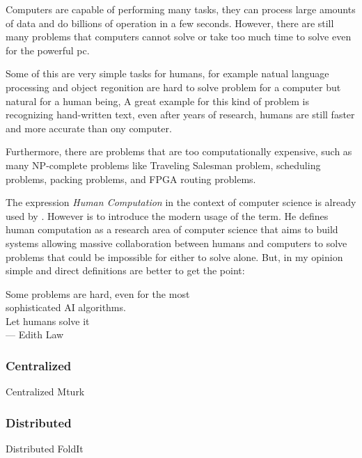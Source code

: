 
Computers are capable of performing many tasks, they can process large
amounts of data and do billions of operation in a few seconds.
However, there are still many problems that computers cannot solve
or take too much time to solve even for the powerful pc.

Some of this are very simple tasks for humans, for example natual language
processing and object regonition are hard to solve problem for a computer
but natural for a human being, A great example for this kind of problem
is recognizing hand-written text, even after years of research,
humans are still faster and more accurate than ony computer.

Furthermore, there are problems that are too computationally expensive,
such as many NP-complete problems like Traveling Salesman problem,
scheduling problems, packing problems, and FPGA routing problems.

The expression \emph{Human Computation} in the context of computer
science is already used by \cite{cogprints499}. However is \cite{human:comp}
to introduce the modern usage of the term. He defines human computation
as a research area of computer science that aims to build systems allowing
massive collaboration between humans and computers to solve problems that
could be impossible for either to solve alone. But, in my opinion simple
and direct definitions are better to get the point:
\begin{quoting}
	Some problems are hard, even for the most\\
	sophisticated AI algorithms.\\
	Let humans solve it\omissis\\
	\medskip
    {\rm --- Edith Law}
\end{quoting}

\subsubsection{Centralized}
Centralized Mturk

\subsubsection{Distributed}
Distributed FoldIt